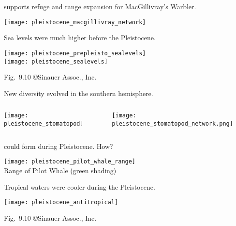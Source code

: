 \documentclass[t]{beamer}
\begin{document}
%
{
\begin{frame}[plain]
\end{frame}}
%
\begin{frame}{ supports refuge and range expansion for MacGillivray's Warbler.}
	\vspace{-\baselineskip}
	\begin{center}
		\texttt{[image: pleistocene\_macgillivray\_network]}
	\end{center}
\end{frame}
%
\begin{frame}[t]{Sea levels were much higher before the Pleistocene.}

	{\centering
		\texttt{[image: pleistocene\_prepleisto\_sealevels]}\\
		\texttt{[image: pleistocene\_sealevels]}\par
	}

	\vfilll
	
	\hfill \tiny Fig.~9.10 \copyright Sinauer Assoc., Inc.
\end{frame}
%
\begin{frame}[t]{New diversity evolved in the southern hemisphere.}
	\begin{columns}[T]
		\begin{column}{0.45\textwidth}
			\vspace{-\baselineskip}
			\begin{center}
				\texttt{[image: pleistocene\_stomatopod]}
			\end{center}
		\end{column}
		\begin{column}{0.45\textwidth}
			\vspace{-\baselineskip}
			\begin{center}
				\texttt{[image: pleistocene\_stomatopod\_network.png]}
			\end{center}
		\end{column}
	\end{columns}
\end{frame}
%
\begin{frame}{ could form during Pleistocene. How?}

	{\centering
		\texttt{[image: pleistocene\_pilot\_whale\_range]}\\
		Range of Pilot Whale (green shading)\par
	}

\end{frame}
%
\begin{frame}{Tropical waters were cooler during the Pleistocene.}

	{\centering
		\texttt{[image: pleistocene\_antitropical]}\par
	}

	\vfilll

	\hfill \tiny Fig.~9.10 \copyright Sinauer Assoc., Inc.
\end{frame}
%
\end{document}
